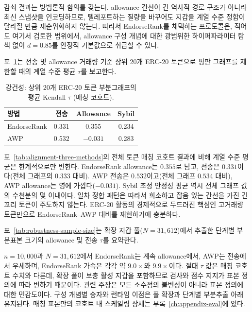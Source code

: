 감쇠 결과는 방법론적 함의를 갖는다. allowance 간선이 긴 역사적 경로 구조가 아니라 최신 스냅샷을 인코딩하므로, 텔레포트하는 질량을 바꾸어도 지갑을 계열 수준 정합이 달라질 만큼 재순위화하지 않는다. 따라서 EndorseRank를 채택하는 프로토콜은, 적어도 여기서 검토한 범위에서, allowance 구성 개념에 대한 광범위한 하이퍼파라미터 탐색 없이 $d=0.85$를 안정적 기본값으로 취급할 수 있다.


표~\ref{tab:robustness-tokens}는 전송 및 allowance 거래량 기준 상위 20개 ERC-20 토큰으로 평판 그래프를 제한할 때의 계열 수준 평균 $\tau$를 보고한다.

\begin{table}[htbp]
\centering
\caption{강건성: 상위 20개 ERC-20 토큰 부분그래프의 평균 Kendall $\tau$ (매칭 코호트).}
\label{tab:robustness-tokens}
\begin{tabular}{lccc}
\toprule
방법 & 전송 & Allowance & Sybil \\
\midrule
EndorseRank & 0.331 & 0.355 & 0.234 \\
AWP & 0.532 & $-0.031$ & 0.283 \\
\bottomrule
\end{tabular}
\end{table}

표~\ref{tab:alignment-three-methods}의 전체 토큰 매칭 코호트 결과에 비해 계열 수준 평균은 한계적으로만 변한다. EndorseRank allowance는 $0.355$로 남고, 전송은 $0.331$이다(전체 그래프의 $0.333$ 대비). AWP 전송은 $0.532$이고(전체 그래프 $0.534$ 대비), AWP allowance는 영에 가깝다($-0.031$). Sybil 조정 안정성 평균 역시 전체 그래프 값의 수천분의 몇 이내이다. 일차 정합 패턴은 따라서 희소하고 잡음 있는 간선을 가진 긴 꼬리 토큰이 주도하지 않는다. ERC-20 활동의 경제적으로 두드러진 핵심인 고거래량 토큰만으로 EndorseRank--AWP 대비를 재현하기에 충분하다.


표~\ref{tab:robustness-sample-size}는 확장 지갑 풀($N=31{,}612$)에서 추출한 단계별 부분표본 크기의 allowance 및 전송 $\tau$를 요약한다.



$n=10{,}000$과 $N=31{,}612$에서 EndorseRank는 계속 allowance에서, AWP는 전송에서 우세하며, EndorseRank 가속은 각각 약 $9.0\times$와 $9.9\times$이다. 절대 $\tau$ 값은 매칭 코호트 수치와 다른데, 확장 풀이 보충 활성 지갑을 포함하므로 검사와 점수 지지가 표본 정의에 따라 변하기 때문이다. 관련 주장은 모든 소수점의 불변성이 아니라 표본 정의에 대한 민감도이다. 구성 개념별 승자와 런타임 이점은 풀 확장과 단계별 부분추출 아래 유지된다. 매칭 표본만의 코호트 내 스케일링 상세는 부록~\ref{ch:appendix-eval}에 있다.

